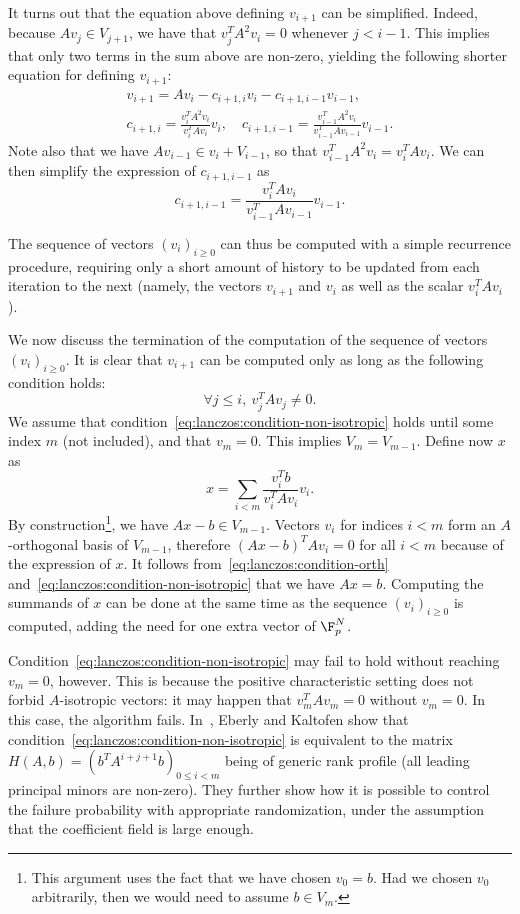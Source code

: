 It turns out that the equation above defining $v_{i+1}$ can be
simplified.
Indeed, because $Av_j\in V_{j+1}$, we have that
$v_j^TA^2v_i=0$ whenever $j<i-1$. This implies that only two terms in
the sum above are non-zero, yielding the following shorter equation for
defining $v_{i+1}$:
\begin{gather*}
    v_{i+1} = Av_i - c_{i+1,i} v_i - c_{i+1,i-1} v_{i-1},\\
    c_{i+1,i} =
    \frac{v_i^TA^2v_i}{v_i^TAv_i}v_i,\quad
    c_{i+1,i-1} = 
    \frac{v_{i-1}^TA^2v_{i}}{v_{i-1}^TAv_{i-1}}v_{i-1}.
\end{gather*}
Note also that we have $Av_{i-1} \in v_i + V_{i-1}$,
so that $v_{i-1}^TA^2v_{i}=v_i^TAv_i$. We can
then simplify the expression of $c_{i+1,i-1}$ as
$$c_{i+1,i-1}
=\frac{v_i^TAv_{i}}{v_{i-1}^TAv_{i-1}}v_{i-1}.$$

The sequence of vectors $(v_i)_{i\geq0}$ can thus be computed
with a simple recurrence procedure, requiring only a short amount of
history to be updated from each iteration to the next (namely, the
vectors $v_{i+1}$ and $v_{i}$ as well as the scalar $v_{i}^TAv_{i}$). 

We now discuss the termination of the computation of the sequence of
vectors $(v_i)_{i\geq0}$. It is clear that $v_{i+1}$ can be computed only
as long as the following condition holds:
\begin{equation}
    \label{eq:lanczos:condition-non-isotropic}
    \forall j\leq i,\ v_j^TAv_j\not=0.
\end{equation}
We assume
that condition~\eqref{eq:lanczos:condition-non-isotropic} holds until
some index $m$ (not included), and that $v_{m}=0$. This implies
$V_{m}=V_{m-1}$. Define now $x$ as
$$x=\sum_{i<m}\frac{v_i^Tb}{v_i^TAv_i}v_i.$$
By construction\footnote{This argument uses the fact that we have chosen
$v_0=b$. Had we chosen $v_0$ arbitrarily, then we would need to assume
$b\in V_m$.}, we have $Ax-b\in V_{m-1}$. Vectors $v_i$ for indices $i<m$
form an $A$-orthogonal basis of $V_{m-1}$, therefore $(Ax-b)^TAv_i=0$ for all
$i<m$ because of the expression of $x$. It follows from~\eqref{eq:lanczos:condition-orth}
and~\eqref{eq:lanczos:condition-non-isotropic} that we have $Ax=b$.
Computing the summands of $x$ can be done at the same
time as the sequence $(v_i)_{i\geq0}$ is computed, adding the need for
one extra vector of $\F_p^N$.

Condition~\eqref{eq:lanczos:condition-non-isotropic} may fail to hold
without reaching  $v_{m}=0$, however. This is because the positive characteristic
setting does not forbid $A$-isotropic vectors: it may happen that
$v_m^TAv_m=0$ without $v_{m}=0$. In this case, the algorithm fails. In~\cite{EbKa97},
Eberly and Kaltofen show that
condition~\eqref{eq:lanczos:condition-non-isotropic} is equivalent to the
matrix $H(A,b)=(b^TA^{i+j+1}b)_{0\leq i<m}$ being of generic rank
profile (all leading principal minors are non-zero). They further show
how it is possible to control the failure probability with appropriate
randomization, under the assumption that the coefficient field is large
enough.

